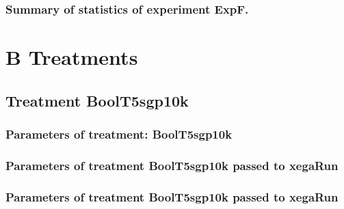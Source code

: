 \documentclass[18pt,c]{beamer}
\begin{document}
 \begin{frame}
 \fontsize{8pt}{9pt}\selectfont
 \frametitle{ Summary of statistics of experiment ExpF. }

 \label{ExpFStatsTable005.tex}  
 \end{frame}

\clearpage
\section{B Treatments}
\clearpage
\subsection{Treatment BoolT5sgp10k}

 \begin{frame}
 \fontsize{8pt}{9pt}\selectfont
 \frametitle{  Parameters of treatment: BoolT5sgp10k 
 }

 \label{ExpFtParmTable000.tex}  
 \end{frame}


 \begin{frame}
 \fontsize{8pt}{9pt}\selectfont
 \frametitle{  Parameters of treatment BoolT5sgp10k passed to xegaRun
 }

 \label{ExpFtParmTable001.tex}  
 \end{frame}


 \begin{frame}
 \fontsize{8pt}{9pt}\selectfont
 \frametitle{  Parameters of treatment BoolT5sgp10k passed to xegaRun
 }

 \label{ExpFtParmTable002.tex}  
 \end{frame}

\end{document}
